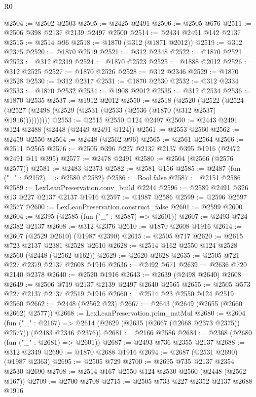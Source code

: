 \begin{lexlean}{R0}
\begin{coremodule}
@2504 := @2502 @2503
@2505 := @2425 @2491
@2506 := @2505 @676
@2511 := @2506 @398 @2137 @2139 @2497 @2500
@2514 := @2434 @2491 @142 @2137
@2515 := @2514 @96
@2518 := @1870 (@312 (@1871 @2012))
@2519 := @312 @2375
@2520 := @1870 @2519
@2521 := @312 @2348
@2522 := @1870 @2521
@2523 := @312 @2319
@2524 := @1870 @2523
@2525 := @1888 @2012
@2526 := @312 @2525
@2527 := @1870 @2526
@2528 := @312 @2346
@2529 := @1870 @2528
@2530 := @312 @2317
@2531 := @1870 @2530
@2532 := @312 @2334
@2533 := @1870 @2532
@2534 := @1908 @2012
@2535 := @312 @2534
@2536 := @1870 @2535
@2537 := @1912 @2012
@2550 := @2518
    (@2520
      (@2522 (@2524 (@2527 (@2498 (@2529 (@2531 (@2533 (@2536 (@1870 (@312 @2537) @1916))))))))))
@2553 := @2515 @2550 @124 @2497
@2560 := @2443 @2491 @124 @2488 (@2448 (@2449 @2491 @124))
@2561 := @2553 @2560
@2562 := @2459 @2550
@2564 := @2448 (@2562 @96)
@2565 := @2561 @2564
@2566 := @2511 @2565
@2576 := @2505 @396 @227 @2137 @2137 @395 @1916 (@2472 @2491 @11 @395)
@2577 := @2478 @2491
@2580 := @2504 (@2566 (@2576 @2577))
@2581 := @2483 @2373
@2582 := @2581 @156
@2585 := @2487 (fun ("_" : @2152) => @2580 @2582)
@2586 := Bool.false
@2587 := @2151 @2586
@2589 := LexLeanPreservation.conv_build @2244
@2596 := @2589 @2491 @326 @13 @227 @2137 @2137 @1916
@2597 := @1987 @2586
@2599 := @2596 @2597 @2577
@2600 := LexLeanPreservation.construct_false
@2601 := @2599 @2600
@2604 := @2395 (@2585 (fun ("_" : @2587) => @2601))
@2607 := @2493 @724 @2382 @2137
@2608 := @312 @2376
@2610 := @1870 @2608 @1916
@2614 := @2607 (@2529 @2610) (@1987 @2390)
@2615 := @2505 @717
@2620 := @2615 @723 @2137 @2381 @2528 @2610
@2628 := @2514 @162 @2550 @124 @2528 @2560 (@2448 (@2562 @162))
@2629 := @2620 @2628
@2635 := @2505 @721 @227 @2379 @2137 @2608 @1916
@2636 := @2492 @671
@2639 := @2636 @720 @2140 @2378
@2640 := @2520 @1916
@2643 := @2639 (@2498 @2640) @2608
@2649 := @2506 @719 @2137 @2139 @2497 @2640 @2565
@2655 := @2505 @573 @227 @2137 @2137 @2519 @1916
@2660 := @2514 @23 @2550 @124 @2519 @2560
@2662 := @2448 (@2562 @23)
@2667 := @2643 (@2649 (@2655 (@2660 @2662) @2577))
@2668 := LexLeanPreservation.prim_natMul
@2680 := @2604
    (fun ("_" : @2167) =>
    @2614 (@2629 (@2635 (@2667 (@2668 @2373 @2375)) @2577)) (@2483 @2346 @2376))
@2681 := @2166 @2586
@2684 := @2368 (@2680 (fun ("_" : @2681) => @2601))
@2687 := @2493 @736 @2355 @2137
@2688 := @312 @2349
@2690 := @1870 @2688 @1916
@2694 := @2687 (@2531 @2690) (@1987 @2363)
@2695 := @2505 @729
@2700 := @2695 @735 @2137 @2354 @2530 @2690
@2708 := @2514 @167 @2550 @124 @2530 @2560 (@2448 (@2562 @167))
@2709 := @2700 @2708
@2715 := @2505 @733 @227 @2352 @2137 @2688 @1916

\end{coremodule}
\end{lexlean}
